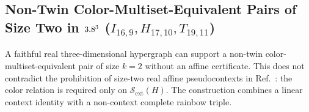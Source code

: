 \documentclass[aps,pra,reprint,superscriptaddress,longbibliography,nofootinbib,floatfix,10pt]{revtex4-2}
\theoremstyle{definition}\newtheorem{definition}[theorem]{Definition}
\theoremstyle{remark}\newtheorem{remark}[theorem]{Remark}
\newcommand{\Sc}{\mathcal S}\newcommand{\Cc}{\mathcal C}\newcommand{\Wc}{\mathcal W}
\begin{document}
\subsection{Non-Twin Color-Multiset-Equivalent Pairs of Size Two in \texorpdfstring{$3.8^3$}{R3} (\texorpdfstring{$I_{16,9},H_{17,10},T_{19,11}$}{I16,9, H17,10, T19,11})}\label{sec:size2-real}

A faithful real three-dimensional hypergraph can support a non-twin color-multiset-equivalent pair of size $k=2$ without an affine certificate. This does not contradict the prohibition of size-two real affine pseudocontexts in Ref.~\cite{2026-Navara-Svozil-pseudocontexts}: the color relation is required only on $\Sc_{\mathrm{ext}}(H)$. The construction combines a linear context identity with a non-context complete rainbow triple.
\end{document}
